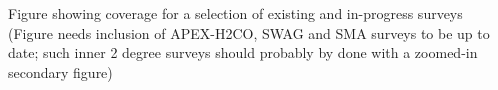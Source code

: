 Figure showing coverage for a selection of existing and in-progress surveys (Figure needs inclusion of APEX-H2CO, SWAG and SMA surveys to be up to date; such inner 2 degree surveys should probably by done with a zoomed-in secondary figure)
